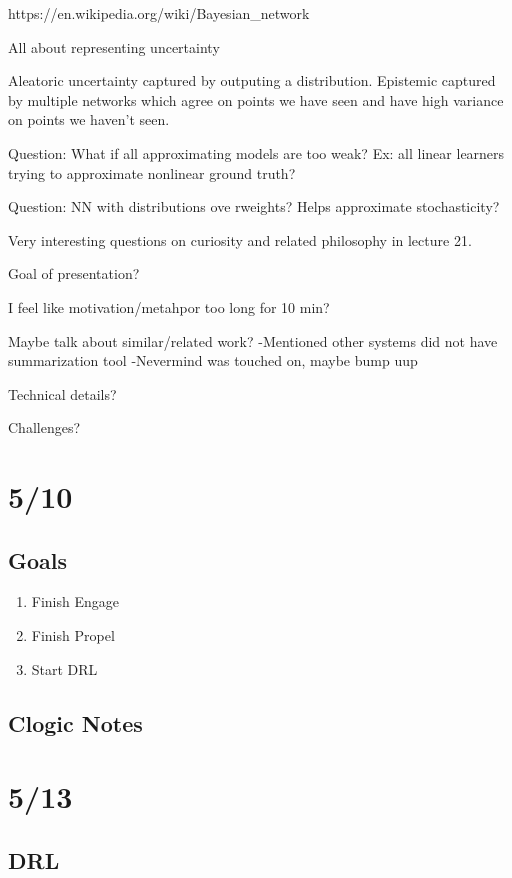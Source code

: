 \documentclass[11pt]{article}
\theoremstyle{remark}
\begin{document}
https://en.wikipedia.org/wiki/Bayesian_network

All about representing uncertainty

Aleatoric uncertainty captured by outputing a distribution. Epistemic captured by multiple networks which agree on points we have seen and have high variance on points we haven't seen.

Question: What if all approximating models are too weak? Ex: all linear learners trying to approximate nonlinear ground truth? 

Question: NN with distributions ove rweights? Helps approximate stochasticity?

Very interesting questions on curiosity and related philosophy in lecture 21.



Goal of presentation?

I feel like motivation/metahpor too long for 10 min?

Maybe talk about similar/related work?
-Mentioned other systems did not have summarization tool
-Nevermind was touched on, maybe bump uup

Technical details?

Challenges?

\section{5/10}

\subsection{Goals}

\begin{enumerate}
	\item Finish Engage
	\item Finish Propel
	\item Start DRL
\end{enumerate}

\subsection{Clogic Notes}

\section{5/13}

\subsection{DRL}
\end{document}

